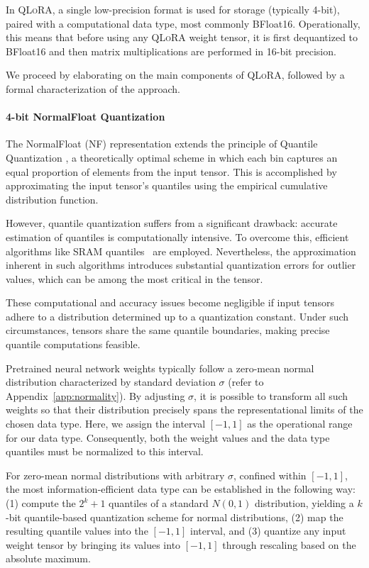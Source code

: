 In \textsc{QLoRA}, a single low-precision format is used for storage (typically 4-bit), paired with a computational data type, most commonly BFloat16. Operationally, this means that before using any \textsc{QLoRA} weight tensor, it is first dequantized to BFloat16 and then matrix multiplications are performed in 16-bit precision.

We proceed by elaborating on the main components of \textsc{QLoRA}, followed by a formal characterization of the approach.

\paragraph{4-bit NormalFloat Quantization} The NormalFloat (NF) representation extends the principle of Quantile Quantization \citep{dettmers2022optimizers}, a theoretically optimal scheme in which each bin captures an equal proportion of elements from the input tensor. This is accomplished by approximating the input tensor's quantiles using the empirical cumulative distribution function.

However, quantile quantization suffers from a significant drawback: accurate estimation of quantiles is computationally intensive. To overcome this, efficient algorithms like SRAM quantiles~\citep{dettmers2022optimizers} are employed. Nevertheless, the approximation inherent in such algorithms introduces substantial quantization errors for outlier values, which can be among the most critical in the tensor.

These computational and accuracy issues become negligible if input tensors adhere to a distribution determined up to a quantization constant. Under such circumstances, tensors share the same quantile boundaries, making precise quantile computations feasible.

Pretrained neural network weights typically follow a zero-mean normal distribution characterized by standard deviation $\sigma$ (refer to Appendix~\ref{app:normality}). By adjusting $\sigma$, it is possible to transform all such weights so that their distribution precisely spans the representational limits of the chosen data type. Here, we assign the interval $[-1, 1]$ as the operational range for our data type. Consequently, both the weight values and the data type quantiles must be normalized to this interval.

For zero-mean normal distributions with arbitrary $\sigma$, confined within $[-1, 1]$, the most information-efficient data type can be established in the following way: (1) compute the $2^k+1$ quantiles of a standard $N(0, 1)$ distribution, yielding a $k$-bit quantile-based quantization scheme for normal distributions, (2) map the resulting quantile values into the $[-1, 1]$ interval, and (3) quantize any input weight tensor by bringing its values into $[-1, 1]$ through rescaling based on the absolute maximum.

